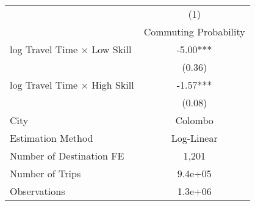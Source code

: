 {
\def\sym#1{\ifmmode^{#1}\else\(^{#1}\)\fi}
\begin{tabular}{l*{1}{c}}
\toprule
            &\multicolumn{1}{c}{(1)}\\
            &\multicolumn{1}{c}{Commuting Probability}\\
\addlinespace\addlinespace
log Travel Time $\times$ Low Skill&       -5.00***\\
            &      (0.36)   \\
\addlinespace
log Travel Time $\times$ High Skill&       -1.57***\\
            &      (0.08)   \\
\addlinespace\addlinespace
City        &     Colombo   \\
Estimation Method&  Log-Linear   \\
Number of Destination FE&       1,201   \\
Number of Trips&     9.4e+05   \\
Observations&     1.3e+06   \\
\bottomrule
\end{tabular}
}
